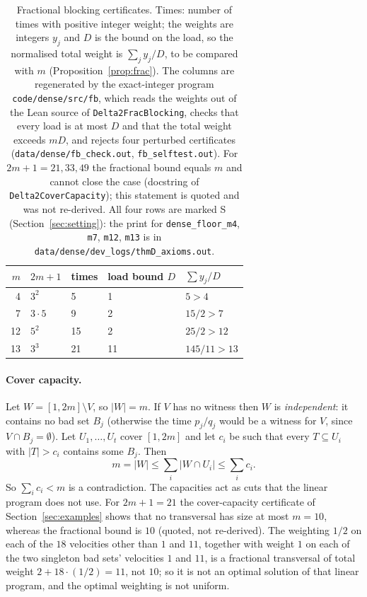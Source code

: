 \documentclass[11pt]{article}
\theoremstyle{remark}
\begin{document}
\begin{table}[ht]
\centering
\begin{tabular}{rllll}
\toprule
$m$ & $2m+1$ & times & load bound $D$ & $\sum y_j/D$\\
\midrule
4 & $3^2$ & 5 & 1 & $5>4$\\
7 & $3\cdot5$ & 9 & 2 & $15/2>7$\\
12 & $5^2$ & 15 & 2 & $25/2>12$\\
13 & $3^3$ & 21 & 11 & $145/11>13$\\
\bottomrule
\end{tabular}
\caption{Fractional blocking certificates. Times: number of times with positive integer weight; the weights are integers $y_j$ and $D$ is the bound on the load, so the normalised total weight is $\sum_j y_j/D$, to be compared with $m$ (Proposition~\ref{prop:frac}). The columns are regenerated by the exact-integer program \texttt{code/dense/src/fb}, which reads the weights out of the Lean source of \texttt{Delta2FracBlocking}, checks that every load is at most $D$ and that the total weight exceeds $mD$, and rejects four perturbed certificates (\texttt{data/dense/fb\_check.out}, \texttt{fb\_selftest.out}). For $2m+1=21,33,49$ the fractional bound equals $m$ and cannot close the case (docstring of \texttt{Delta2CoverCapacity}); this statement is quoted and was not re-derived. All four rows are marked S (Section~\ref{sec:setting}): the print for \texttt{dense\_floor\_m4}, \texttt{m7}, \texttt{m12}, \texttt{m13} is in \texttt{data/dense/dev\_logs/thmD\_axioms.out}.}\label{tab:frac}
\end{table}

\paragraph{Cover capacity.} Let $W=[1,2m]\setminus V$, so $|W|=m$. If $V$ has no witness then $W$ is \emph{independent}: it contains no bad set $B_j$ (otherwise the time $p_j/q_j$ would be a witness for $V$, since $V\cap B_j=\emptyset$). Let $U_1,\dots,U_t$ cover $[1,2m]$ and let $c_i$ be such that every $T\subseteq U_i$ with $|T|>c_i$ contains some $B_j$. Then
\[
m=|W|\le\sum_i|W\cap U_i|\le\sum_ic_i .
\]
So $\sum_ic_i<m$ is a contradiction. The capacities act as cuts that the linear program does not use. For $2m+1=21$ the cover-capacity certificate of Section~\ref{sec:examples} shows that no transversal has size at most $m=10$, whereas the fractional bound is $10$ (quoted, not re-derived). The weighting $1/2$ on each of the $18$ velocities other than $1$ and $11$, together with weight $1$ on each of the two singleton bad sets' velocities $1$ and $11$, is a fractional transversal of total weight $2+18\cdot(1/2)=11$, not $10$; so it is not an optimal solution of that linear program, and the optimal weighting is not uniform.
\end{document}
